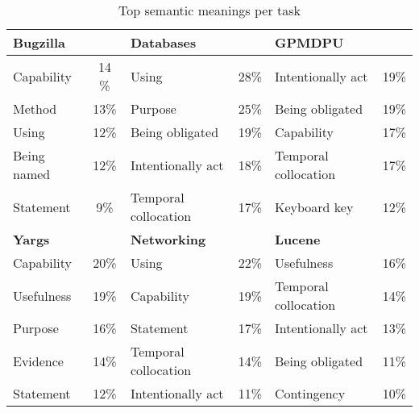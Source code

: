 
\begin{table}
\begin{footnotesize}
\begin{threeparttable}    
\begin{tabular}{lclclc}
\hline    
\multicolumn{2}{l}{\textbf{Bugzilla}} & \multicolumn{2}{l}{\textbf{Databases}} & \multicolumn{2}{l}{\textbf{GPMDPU}} \\     
\hline
\hline
Capability & 14 \% &
Using & 28\% &
Intentionally act & 19\%  \\
%
Method\tnote{\dag}  & 13\% &
Purpose  & 25\% & 
Being obligated & 19\% \\
%
Using  & 12\% &
Being obligated  & 19\% &
Capability & 17\% \\
%
Being named  & 12\% &
Intentionally act  & 18\% &
Temporal collocation & 17\% \\
%
Statement & 9\% &
Temporal collocation  & 17\% &
Keyboard key\tnote{\dag} & 12\% \\
\hline    
\multicolumn{2}{l}{\textbf{Yargs}} & \multicolumn{2}{l}{\textbf{Networking}} & \multicolumn{2}{l}{\textbf{Lucene}} \\     
\hline
\hline
Capability & 20\% &
Using  & 22\% &
Usefulness & 16\% \\
%
Usefulness & 19\%  &
Capability & 19\% &
Temporal collocation & 14\% \\
%
Purpose & 16\% &
Statement & 17\% &
Intentionally act  & 13\% \\
%
Evidence & 14\% &
Temporal collocation & 14\% &
Being obligated & 11\% \\
%
Statement  & 12\% &
Intentionally act & 11\% &
Contingency  & 10\% \\
\hline
\end{tabular}
\end{threeparttable}    
\end{footnotesize}
\caption{Top semantic meanings per task}
\label{tbl:frames-freq-task}
\end{table}